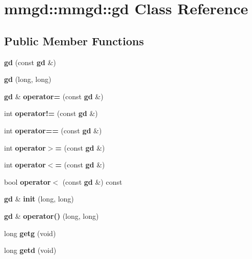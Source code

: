 \section{mmgd\+:\+:mmgd\+:\+:gd Class Reference}
\label{classmmgd_1_1mmgd_1_1gd}
\subsection*{Public Member Functions}
\begin{DoxyCompactItemize}
\item 
\mbox{\label{classmmgd_1_1mmgd_1_1gd_ac8e74872b52997c0aa6090b82d721e08}} 
{\bfseries gd} (const \textbf{ gd} \&)
\item 
\mbox{\label{classmmgd_1_1mmgd_1_1gd_a512d9003aff50f7b7d2185d7e7272ac6}} 
{\bfseries gd} (long, long)
\item 
\mbox{\label{classmmgd_1_1mmgd_1_1gd_a050613b096bdf3cb95a46d8a207b92cd}} 
\textbf{ gd} \& {\bfseries operator=} (const \textbf{ gd} \&)
\item 
\mbox{\label{classmmgd_1_1mmgd_1_1gd_aceb773d2d343c2c0b9a14f6030d0ac62}} 
int {\bfseries operator!=} (const \textbf{ gd} \&)
\item 
\mbox{\label{classmmgd_1_1mmgd_1_1gd_a4ff3fb6e099001641de565a933d4d898}} 
int {\bfseries operator==} (const \textbf{ gd} \&)
\item 
\mbox{\label{classmmgd_1_1mmgd_1_1gd_acfc56cfcff1288f8f4b6120394e7548f}} 
int {\bfseries operator$>$=} (const \textbf{ gd} \&)
\item 
\mbox{\label{classmmgd_1_1mmgd_1_1gd_a3e38156b0cf3e7cd0a22ba765b874e26}} 
int {\bfseries operator$<$=} (const \textbf{ gd} \&)
\item 
\mbox{\label{classmmgd_1_1mmgd_1_1gd_a89fc335c8bfe23cef630b06e8f1ae507}} 
bool {\bfseries operator$<$} (const \textbf{ gd} \&) const
\item 
\mbox{\label{classmmgd_1_1mmgd_1_1gd_a2d04acd086664d7880a2a39ffef3588d}} 
\textbf{ gd} \& {\bfseries init} (long, long)
\item 
\mbox{\label{classmmgd_1_1mmgd_1_1gd_a473a1d68f6362c8b8e7f48aeb38e6461}} 
\textbf{ gd} \& {\bfseries operator()} (long, long)
\item 
\mbox{\label{classmmgd_1_1mmgd_1_1gd_acffddb2c16cf7e89527c4b5491bec861}} 
long {\bfseries getg} (void)
\item 
\mbox{\label{classmmgd_1_1mmgd_1_1gd_af3ac512a3094ac6c6ca4f1ef10374b07}} 
long {\bfseries getd} (void)
\end{DoxyCompactItemize}
